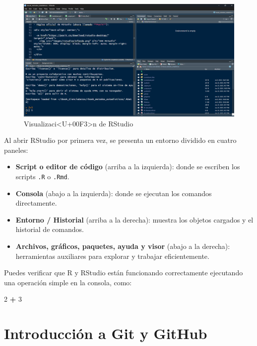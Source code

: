 \documentclass[
]{book}
\newenvironment{Shaded}{\begin{snugshade}}{\end{snugshade}}
\newcommand{\DecValTok}[1]{\textcolor[rgb]{0.00,0.00,0.81}{#1}}
\newcommand{\SpecialCharTok}[1]{\textcolor[rgb]{0.81,0.36,0.00}{\textbf{#1}}}
\providecommand{\tightlist}{%
  \setlength{\itemsep}{0pt}\setlength{\parskip}{0pt}}
\begin{document}
\begin{figure}

{\centering \includegraphics[width=1\linewidth]{images/rs5} 

}

\caption{Visualizaci<U+00F3>n de RStudio}\label{fig:rs-inst-fig}
\end{figure}

Al abrir RStudio por primera vez, se presenta un entorno dividido en cuatro paneles:

\begin{itemize}
\tightlist
\item
  \textbf{Script o editor de código} (arriba a la izquierda): donde se escriben los scripts \texttt{.R} o \texttt{.Rmd}.
\item
  \textbf{Consola} (abajo a la izquierda): donde se ejecutan los comandos directamente.
\item
  \textbf{Entorno / Historial} (arriba a la derecha): muestra los objetos cargados y el historial de comandos.
\item
  \textbf{Archivos, gráficos, paquetes, ayuda y visor} (abajo a la derecha): herramientas auxiliares para explorar y trabajar eficientemente.
\end{itemize}

Puedes verificar que R y RStudio están funcionando correctamente ejecutando una operación simple en la consola, como:

\begin{Shaded}
\begin{Highlighting}[]
\DecValTok{2} \SpecialCharTok{+} \DecValTok{3}
\end{Highlighting}
\end{Shaded}

\section{Introducción a Git y GitHub}\label{introducciuxf3n-a-git-y-github}
\end{document}
